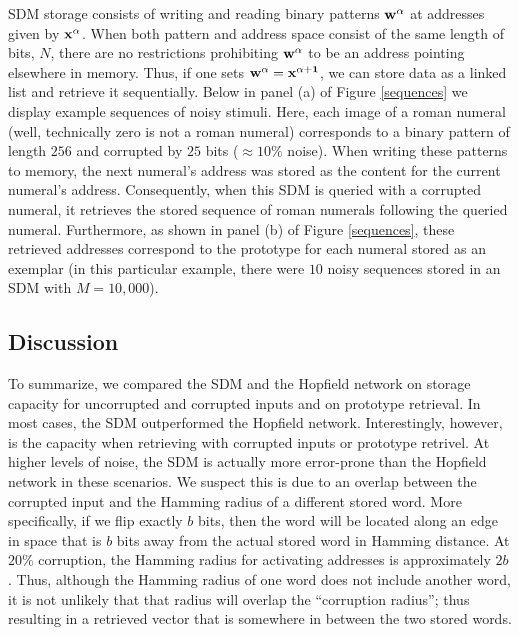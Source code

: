 \documentclass[10pt,letterpaper]{article}
\begin{document}
SDM storage consists of writing and reading binary patterns $\bf{w}^{\alpha}$ at addresses given by $\bf{x}^{\alpha}$. When both pattern and address space consist of the same length of bits, $N$, there are no restrictions prohibiting $\bf{w}^{\alpha}$ to be an address pointing elsewhere in memory. Thus, if one sets $\bf{w}^{\alpha} = \bf{x}^{\alpha+1}$, we can store data as a linked list and retrieve it sequentially. Below in panel (a) of Figure \ref{sequences} we display example sequences of noisy stimuli. Here, each image of a roman numeral (well, technically zero is not a roman numeral) corresponds to a binary pattern of length $256$ and corrupted by $25$ bits ($\approx 10\%$ noise). When writing these patterns to memory, the next numeral's address was stored as the content for the current numeral's address. Consequently, when this SDM is queried with a corrupted numeral, it retrieves the stored sequence of roman numerals following the queried numeral. Furthermore, as shown in panel (b) of Figure \ref{sequences}, these retrieved addresses correspond to the prototype for each numeral stored as an exemplar (in this particular example, there were $10$ noisy sequences stored in an SDM with $M=10,000$).




\subsection{Discussion}

To summarize, we compared the SDM and the Hopfield network on storage
capacity for uncorrupted and corrupted inputs and on prototype
retrieval. In most cases, the SDM outperformed the Hopfield
network. Interestingly, however, is the capacity when retrieving with
corrupted inputs or prototype retrivel. At higher levels of noise, the
SDM is actually more error-prone than the Hopfield network in these
scenarios. We suspect this is due to an overlap between the corrupted
input and the Hamming radius of a different stored word. More
specifically, if we flip exactly $b$ bits, then the word will be
located along an edge in space that is $b$ bits away from the actual
stored word in Hamming distance. At $20\%$ corruption, the Hamming
radius for activating addresses is approximately $2b$. Thus, although
the Hamming radius of one word does not include another word, it is
not unlikely that that radius will overlap the ``corruption radius'';
thus resulting in a retrieved vector that is somewhere in between the
two stored words.
\end{document}
